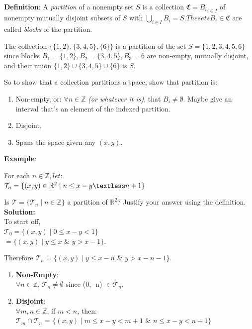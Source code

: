 \documentclass[10pt,landscape]{article}
\begin{document}
\begin{multicols}{3}
\textbf{Definition}: A \textit{partition} of a nonempty set $S$ is a collection $\mathfrak{C} = {B_{i}}_{i \in I}$ of nonempty mutually disjoint subsets of $S$ with $\bigcup_{i \in I} B_{i} = S. The sets B_{i} \in \mathfrak{C}$ are called \textit{blocks} of the partition.

The collection $\{\{1, 2\}, \{3, 4, 5\}, \{6\}\}$ is a partition of the set $S = \{1, 2, 3, 4, 5, 6\}$
since blocks $B_{1} = \{1,2\}, B_{2} = \{3, 4, 5\}, B_{3} = {6}$ are non-empty, mutually disjoint, and their union $\{1, 2\} \cup \{3, 4, 5\} \cup \{6\}$ is $S$.

So to show that a collection partitions a space, show that partition is:
	\begin{enumerate}
		\item
			Non-empty, or: $\forall n \in \mathbb{Z}$ \textit{(or whatever it is)}, that ${B_{i}} \neq \emptyset$. Maybe give an interval that's an element of the indexed partition.
		\item
			Disjoint,
		\item
			Spans the space given any $(x, y)$. 
	\end{enumerate}

\textbf{Example}:

For each $n \in \mathbb{Z}, let: $ \\
$\mathcal{T}_{n} = 
\{(x, y) \in 
\mathbb{R}^{2}  \mid n \leq x-y  \textless n+1\}$

Is $\mathcal{T} = \{\mathcal{T}_{n} \mid n \in \mathbb{Z}\}$ a partition of $\mathbb{R}^{2}$? Justify your answer using the definition.  \\

\textbf{Solution:} \\
	To start off, \\
	$\mathcal{T}_{0} = \{(x,y) \mid 0 \leq x-y < 1 \}$ \\
	$= \{(x,y) \mid y \leq x$ \& $y > x-1 \}$.
	
	Therefore $\mathcal{T}_{n} = \{(x,y) \mid y \leq x-n$ \& $y > x-n-1 \}$.

	\begin{enumerate}
	\item
	\textbf{Non-Empty}:  \\
	$\forall n \in \mathbb{Z}$, $\mathcal{T}_{n} \neq \emptyset$ since (0, -n) $\in \mathcal{T}_{n}$.
	
	\item
	\textbf{Disjoint}: \\
	$\forall m,n \in \mathbb{Z}$, if $m < n$, then: \\
	$\mathcal{T}_{m} \cap \mathcal{T}_{n}$ = 
	$\{(x, y) \mid m \leq x-y < m+1$ \& $n \leq x-y < n+1 \}$
	

\end{enumerate}
\end{multicols}
\end{document}
